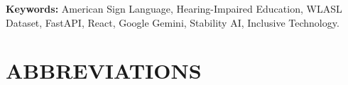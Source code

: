 \documentclass[12pt,a4paper,oneside]{report}
\begin{document}
\textbf{Keywords:} American Sign Language, Hearing-Impaired Education, WLASL Dataset, FastAPI, React, Google Gemini, Stability AI, Inclusive Technology.

\clearpage

\renewcommand{\contentsname}{TABLE OF CONTENTS}
\tableofcontents
\clearpage

\renewcommand{\listfigurename}{LIST OF FIGURES}
\listoffigures
{}
\clearpage

\renewcommand{\listtablename}{LIST OF TABLES}
\listoftables
{}
\clearpage

\chapter*{ABBREVIATIONS}
\end{document}
